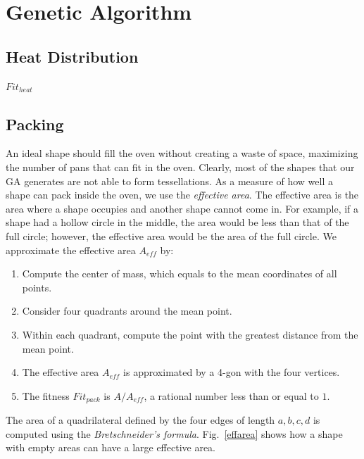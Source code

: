 \documentclass[12pt]{article}
\begin{document}
\section{Genetic Algorithm}
\subsection{Heat Distribution}
$Fit_{heat}$

\subsection{Packing}
An ideal shape should fill the oven without creating a waste of space, maximizing the number of pans that can fit in the oven.
Clearly, most of the shapes that our GA generates are not able to form tessellations.
As a measure of how well a shape can pack inside the oven, we use the \textit{effective area}.
The effective area is the area where a shape occupies and another shape cannot come in.
For example, if a shape had a hollow circle in the middle, the area would be less than that of the full circle; however, the effective area would be the area of the full circle.
We approximate the effective area $A_{eff}$ by:
\begin{enumerate}
  \item Compute the center of mass, which equals to the mean coordinates of all points.
  \item Consider four quadrants around the mean point.
  \item Within each quadrant, compute the point with the greatest distance from the mean point.
  \item The effective area $A_{eff}$ is approximated by a 4-gon with the four vertices.
  \item The fitness $Fit_{pack}$ is $A/A_{eff}$, a rational number less than or equal to $1$.
\end{enumerate}
The area of a quadrilateral defined by the four edges of length $a,b,c,d$ is computed using the \textit{Bretschneider's formula}.
Fig.~\ref{effarea} shows how a shape with empty areas can have a large effective area.
\end{document}
